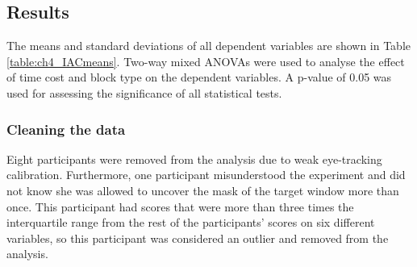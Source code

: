 \subsection{Results}
The means and standard deviations of all dependent variables are shown in Table \ref{table:ch4_IACmeans}. Two-way mixed ANOVAs were used to analyse the effect of time cost and block type on the dependent variables. A p-value of 0.05 was used for assessing the significance of all statistical tests. 

\subsubsection{Cleaning the data}
Eight participants were removed from the analysis due to weak eye-tracking calibration. Furthermore, one participant misunderstood the experiment and did not know she was allowed to uncover the mask of the target window more than once. This participant had scores that were more than three times the interquartile range from the rest of the participants' scores on six different variables, so this participant was considered an outlier and removed from the analysis. 

